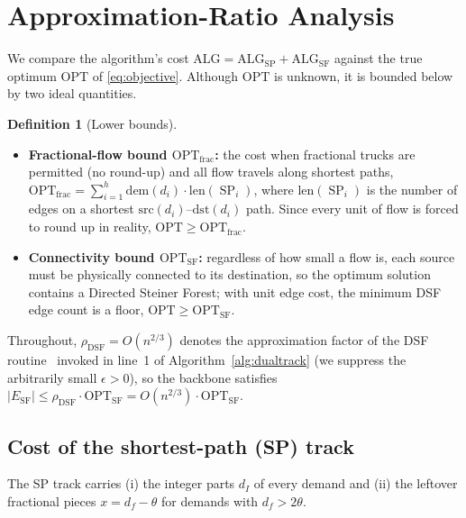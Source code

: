 \documentclass[11pt]{article}
\theoremstyle{definition}
\newtheorem{definition}{Definition}
\theoremstyle{remark}
\newcommand{\OPT}{\mathrm{OPT}}
\newcommand{\OPTfrac}{\OPT_{\mathrm{frac}}}
\newcommand{\OPTSF}{\OPT_{\mathrm{SF}}}
\newcommand{\ALG}{\mathrm{ALG}}
\newcommand{\ALGSP}{\ALG_{\mathrm{SP}}}
\newcommand{\ALGSF}{\ALG_{\mathrm{SF}}}
\newcommand{\ESF}{E_{\mathrm{SF}}}
\newcommand{\src}{\mathrm{src}}
\newcommand{\dst}{\mathrm{dst}}
\newcommand{\dem}{\mathrm{dem}}
\newcommand{\len}{\mathrm{len}}
\DeclareMathOperator{\SP}{SP}
\begin{document}
\section{Approximation-Ratio Analysis}\label{sec:analysis}

We compare the algorithm's cost $\ALG=\ALGSP+\ALGSF$ against the true optimum $\OPT$ of
\eqref{eq:objective}. Although $\OPT$ is unknown, it is bounded below by two ideal quantities.

\begin{definition}[Lower bounds]\label{def:lb}
\leavevmode
\begin{itemize}[topsep=2pt,itemsep=2pt]
  \item \textbf{Fractional-flow bound $\OPTfrac$:} the cost when fractional trucks are permitted (no
        round-up) and all flow travels along shortest paths,
        $\OPTfrac=\sum_{i=1}^{h}\dem(d_i)\cdot\len(\SP_i)$,
        where $\len(\SP_i)$ is the number of edges on a shortest $\src(d_i)$--$\dst(d_i)$ path.
        Since every unit of flow is forced to round up in reality, $\OPT\ge\OPTfrac$.
  \item \textbf{Connectivity bound $\OPTSF$:} regardless of how small a flow is, each source must be
        physically connected to its destination, so the optimum solution contains a Directed Steiner
        Forest; with unit edge cost, the minimum DSF edge count is a floor, $\OPT\ge\OPTSF$.
\end{itemize}
\end{definition}

Throughout, $\rho_{\mathrm{DSF}}=O(n^{2/3})$ denotes the approximation factor of the DSF
routine~\cite{BBMRY13} invoked in line~1 of Algorithm~\ref{alg:dualtrack} (we suppress the arbitrarily
small $\epsilon>0$), so the backbone satisfies
$|\ESF|\le \rho_{\mathrm{DSF}}\cdot\OPTSF=O(n^{2/3})\cdot\OPTSF$.

\subsection{Cost of the shortest-path (SP) track}

The SP track carries (i) the integer parts $d_I$ of every demand and (ii) the leftover fractional
pieces $x=d_f-\theta$ for demands with $d_f>2\theta$.
\end{document}
